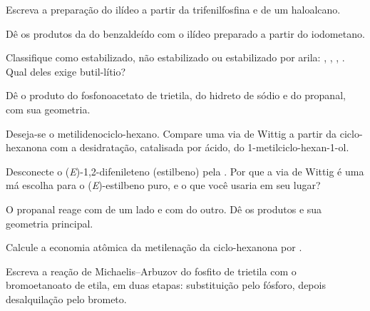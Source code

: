 \begin{exercise}[$\star$]\label{exo:b2:wittig:1}
Escreva a preparação do ilídeo  a partir da trifenilfosfina e de um haloalcano.
\end{exercise}

\begin{exercise}[$\star$]\label{exo:b2:wittig:2}
Dê os produtos da  do benzaldeído com o ilídeo preparado a partir do iodometano.
\end{exercise}

\begin{exercise}[$\star$]\label{exo:b2:wittig:3}
Classifique como estabilizado, não estabilizado ou estabilizado por arila: , ,
, . Qual deles exige butil-lítio?
\end{exercise}

\begin{exercise}[$\star$]\label{exo:b2:wittig:4}
Dê o produto do fosfonoacetato de trietila, do hidreto de sódio e do propanal, com sua geometria.
\end{exercise}

\begin{exercise}[$\star\star$]\label{exo:b2:wittig:5}
Deseja-se o metilidenociclo-hexano. Compare uma via de Wittig a partir da ciclo-hexanona com a
desidratação, catalisada por ácido, do 1-metilciclo-hexan-1-ol.
\end{exercise}

\begin{exercise}[$\star\star$]\label{exo:b2:wittig:6}
Desconecte o (\textit{E})-1,2-difenileteno (estilbeno) pela . Por que a via de Wittig
é uma má escolha para o (\textit{E})-estilbeno puro, e o que você usaria em seu lugar?
\end{exercise}

\begin{exercise}[$\star\star$]\label{exo:b2:wittig:7}
O propanal reage com  de um lado e com  do outro. Dê os produtos e
sua geometria principal.
\end{exercise}

\begin{exercise}[$\star\star$]\label{exo:b2:wittig:8}
Calcule a economia atômica da metilenação da ciclo-hexanona por .
\end{exercise}

\begin{exercise}[$\star\star$]\label{exo:b2:wittig:9}
Escreva a reação de Michaelis--Arbuzov do fosfito de trietila com o bromoetanoato de etila, em duas
etapas: substituição pelo fósforo, depois desalquilação pelo brometo.
\end{exercise}


